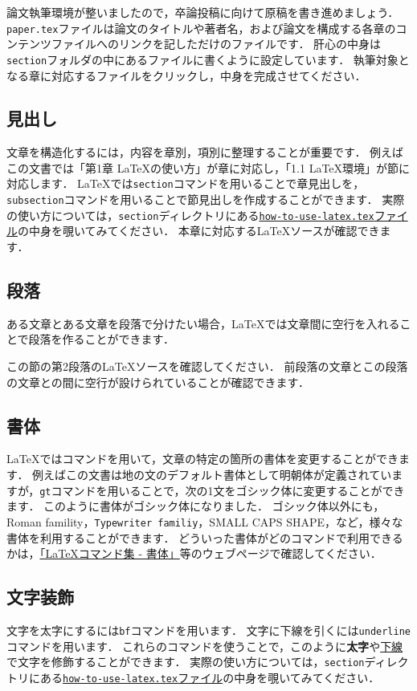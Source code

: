 論文執筆環境が整いましたので，卒論投稿に向けて原稿を書き進めましょう．
\texttt{paper.tex}ファイルは論文のタイトルや著者名，および論文を構成する各章のコンテンツファイルへのリンクを記しただけのファイルです．
肝心の中身は\texttt{section}フォルダの中にあるファイルに書くように設定しています．
執筆対象となる章に対応するファイルをクリックし，中身を完成させてください．



\subsection{見出し}
文章を構造化するには，内容を章別，項別に整理することが重要です．
例えばこの文書では「第1章 LaTeXの使い方」が章に対応し，「1.1 LaTeX環境」が節に対応します．
LaTeXでは\texttt{section}コマンドを用いることで章見出しを，\texttt{subsection}コマンドを用いることで節見出しを作成することができます．
実際の使い方については，\texttt{section}ディレクトリにある\href{https://github.com/ymmt3-lab/thesis-template-2019/blob/master/section/how-to-use-latex.tex}{\texttt{how-to-use-latex.tex}ファイル}の中身を覗いてみてください．
本章に対応するLaTeXソースが確認できます．


\subsection{段落}
ある文章とある文章を段落で分けたい場合，LaTeXでは文章間に空行を入れることで段落を作ることができます．

この節の第2段落のLaTeXソースを確認してください．
前段落の文章とこの段落の文章との間に空行が設けられていることが確認できます．


\subsection{書体}
LaTeXではコマンドを用いて，文章の特定の箇所の書体を変更することができます．
例えばこの文書は地の文のデフォルト書体として明朝体が定義されていますが，{\tt gt}コマンドを用いることで，次の1文をゴシック体に変更することができます．
{\gt このように書体がゴシック体になりました．}
{\gt ゴシック体}以外にも，{\rm Roman famility}，{\tt Typewriter familiy}，{\sc SMALL CAPS SHAPE}，など，様々な書体を利用することができます．
どういった書体がどのコマンドで利用できるかは，\href{http://www.latex-cmd.com/style/style.html}{「LaTeXコマンド集 - 書体」}等のウェブページで確認してください．


\subsection{文字装飾}
文字を太字にするには{\tt bf}コマンドを用います．
文字に下線を引くには{\tt underline}コマンドを用います．
これらのコマンドを使うことで，このように{\bf 太字}や\underline{下線}で文字を修飾することができます．
実際の使い方については，\texttt{section}ディレクトリにある\href{https://github.com/ymmt3-lab/DEIM-and-Thesis/blob/master/section/how-to-use-latex.tex}{\texttt{how-to-use-latex.tex}ファイル}の中身を覗いてみてください．


